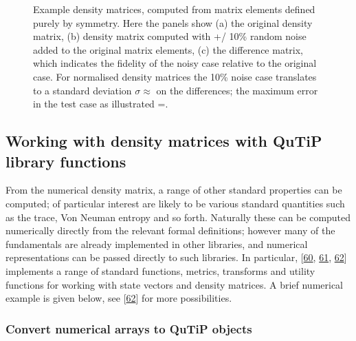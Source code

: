 \documentclass[letterpaper,table,10pt,english]{jupyterBook}
\begin{document}
\begin{figure}[htbp]
\centering
\capstart

\noindent{}
\caption{Example density matrices, computed from matrix elements defined purely by  symmetry. Here the panels show (a) the original density matrix, (b) density matrix computed with +/\sphinxhyphen{} 10\% random noise added to the original matrix elements, (c) the difference matrix, which indicates the fidelity of the noisy case relative to the original case. For normalised density matrices the 10\% noise case translates to a standard deviation \(\sigma\approx\) on the differences; the maximum error in the test case as illustrated =.}\label{\detokenize{part1/theory_density_matrices_310123:fig-denmatd2hcompexample}}\end{figure}


\subsection{Working with density matrices with QuTiP library functions}
\label{\detokenize{part1/theory_density_matrices_310123:working-with-density-matrices-with-qutip-library-functions}}
\sphinxAtStartPar
From the numerical density matrix, a range of other standard properties can be computed; of particular interest are likely to be various standard quantities such as the trace, Von Neuman entropy and so forth. Naturally these can be computed numerically directly from the relevant formal definitions; however many of the fundamentals are already implemented in other libraries, and numerical representations can be passed directly to such libraries. In particular,  {[}\hyperlink{cite.backmatter/bibliography:id637}{60}, \hyperlink{cite.backmatter/bibliography:id638}{61}, \hyperlink{cite.backmatter/bibliography:id746}{62}{]} implements a range of standard functions, metrics, transforms and utility functions for working with state vectors and density matrices. A brief numerical example is given below, see  {[}\hyperlink{cite.backmatter/bibliography:id746}{62}{]} for more possibilities.


\subsubsection{Convert numerical arrays to QuTiP objects}
\label{\detokenize{part1/theory_density_matrices_310123:convert-numerical-arrays-to-qutip-objects}}
\end{document}

